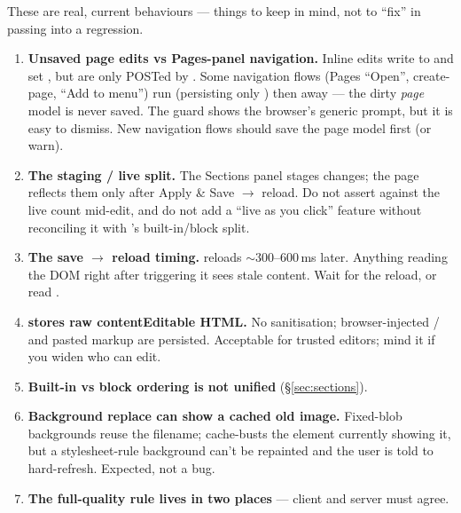 \documentclass[11pt]{article}
\begin{document}
These are real, current behaviours --- things to keep in mind, not to ``fix'' in
passing into a regression.

\begin{enumerate}[leftmargin=1.6em]
  \item \textbf{Unsaved page edits vs Pages-panel navigation.} Inline edits write
  to  and set , but are only POSTed
  by . Some navigation flows (Pages ``Open'', create-page, ``Add to
  menu'') run  (persisting only ) then
   away --- the dirty \emph{page} model is never saved. The
   guard shows the browser's generic prompt, but it is easy to
  dismiss. New navigation flows should save the page model first (or warn).

  \item \textbf{The staging / live split.} The Sections panel stages changes; the
  page reflects them only after Apply \& Save $\to$ reload. Do not assert against
  the live count mid-edit, and do not add a ``live as you click'' feature without
  reconciling it with 's built-in/block split.

  \item \textbf{The save $\to$ reload timing.}  reloads
  $\sim$300--600\,ms later. Anything reading the DOM right after triggering it sees
  stale content. Wait for the reload, or read .

  \item \textbf{ stores raw contentEditable HTML.} No
  sanitisation; browser-injected / and pasted markup are
  persisted. Acceptable for trusted editors; mind it if you widen who can edit.

  \item \textbf{Built-in vs block ordering is not unified} (\S\ref{sec:sections}).

  \item \textbf{Background replace can show a cached old image.} Fixed-blob
  backgrounds reuse the filename;  cache-busts the element
  currently showing it, but a stylesheet-rule background can't be repainted and the
  user is told to hard-refresh. Expected, not a bug.

  \item \textbf{The full-quality rule lives in two places} --- client
   and server 
  must agree.
\end{enumerate}
\end{document}
